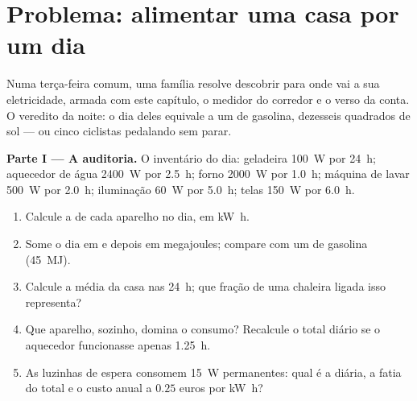 \section{Problema: alimentar uma casa por um dia}

\begin{problem}
\label{pb:g10:energy-conservation:1}
Numa terça-feira comum, uma família resolve descobrir para onde vai a sua
eletricidade, armada com este capítulo, o medidor do corredor e o verso
da conta. O veredito da noite: o dia deles equivale a um  de
gasolina, dezesseis  quadrados de sol --- ou cinco ciclistas
pedalando sem parar.

\medskip
\noindent\textbf{Parte I --- A auditoria.}
O inventário do dia: geladeira \qty{100}{W} por \qty{24}{h}; aquecedor de
água \qty{2400}{W} por \qty{2.5}{h}; forno \qty{2000}{W} por
\qty{1.0}{h}; máquina de lavar \qty{500}{W} por \qty{2.0}{h}; iluminação
\qty{60}{W} por \qty{5.0}{h}; telas \qty{150}{W} por \qty{6.0}{h}.
\begin{enumerate}
  \item Calcule a  de cada aparelho no dia, em \unit{kW.h}.
  \item Some o dia em  e depois em megajoules; compare com
        um  de gasolina (\qty{45}{MJ}).
  \item Calcule a  média da casa nas \qty{24}{h}; que fração de
        uma chaleira ligada isso representa?
  \item Que aparelho, sozinho, domina o consumo? Recalcule o total diário
        se o aquecedor funcionasse apenas \qty{1.25}{h}.
  \item As luzinhas de espera consomem \qty{15}{W} permanentes: qual é a
         diária, a fatia do total e o custo anual a $0.25$ euros
        por \unit{kW.h}?
\end{enumerate}


\end{problem}

